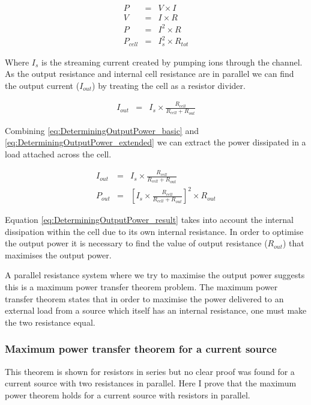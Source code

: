 \begin{eqnarray}
    P & = & V\times I\nonumber \\
    V & = & I\times R\nonumber \\
    P & = & I^{2}\times R\nonumber \\
    P_{cell} & = & I_{s}^{2}\times R_{tot}
    \label{eq:DeterminingOutputPower_basic}
\end{eqnarray}

Where $I_{s}$ is the streaming current created by pumping ions through the channel.
As the output resistance and internal cell resistance are in parallel we can find the output current ($I_{out}$) by treating the cell as a resistor divider.

\begin{eqnarray}
    I_{out} & = & I_{s}\times\frac{R_{cell}}{R_{cell}+R_{out}}
    \label{eq:DeterminingOutputPower_extended}
\end{eqnarray}

Combining \eqref{eq:DeterminingOutputPower_basic} and \eqref{eq:DeterminingOutputPower_extended} we can extract the power dissipated in a load attached across the cell.

\begin{eqnarray}
    I_{out} & = & I_{s}\times\frac{R_{cell}}{R_{cell}+R_{out}}\nonumber \\
    P_{out} & = & \left[I_{s}\times\frac{R_{cell}}{R_{cell}+R_{out}}\right]^{2}\times R_{out}
    \label{eq:DeterminingOutputPower_result}
\end{eqnarray}

Equation \eqref{eq:DeterminingOutputPower_result} takes into account the internal dissipation within the cell due to its own internal resistance.
In order to optimise the output power it is necessary to find the value of output resistance ($R_{out}$) that maximises the output power.

A parallel resistance system where we try to maximise the output power suggests this is a maximum power transfer theorem problem.
The maximum power transfer theorem states that in order to maximise the power delivered to an external load from a source which itself has an internal resistance, one must make the two resistance equal.

\subsubsection*{Maximum power transfer theorem for a current source}
This theorem is shown for resistors in series but no clear proof was found for a current source with two resistances in parallel.
Here I prove that the maximum power theorem holds for a current source with resistors in parallel.

